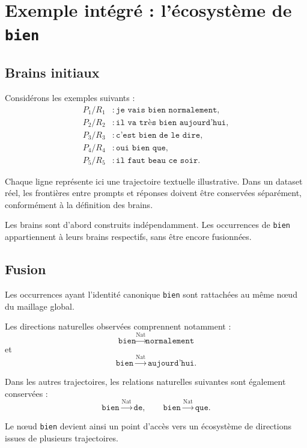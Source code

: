 \documentclass[11pt,a4paper]{report}
\theoremstyle{definition}
\theoremstyle{plain}
\theoremstyle{remark}
\begin{document}
\chapter{Exemple intégré : l'écosystème de \texttt{bien}}

\section{Brains initiaux}

Considérons les exemples suivants :
\[
\begin{aligned}
P_1/R_1 &: \texttt{je vais bien normalement},\\
P_2/R_2 &: \texttt{il va très bien aujourd'hui},\\
P_3/R_3 &: \texttt{c'est bien de le dire},\\
P_4/R_4 &: \texttt{oui bien que},\\
P_5/R_5 &: \texttt{il faut beau ce soir}.
\end{aligned}
\]

Chaque ligne représente ici une trajectoire textuelle illustrative.
Dans un dataset réel, les frontières entre prompts et réponses
doivent être conservées séparément, conformément à la définition
des brains.

Les brains sont d'abord construits indépendamment. Les occurrences
de \texttt{bien} appartiennent à leurs brains respectifs, sans
être encore fusionnées.

\section{Fusion}

Les occurrences ayant l'identité canonique \texttt{bien} sont
rattachées au même nœud du maillage global.

Les directions naturelles observées comprennent notamment :
\[
\texttt{bien}
\overset{\mathrm{Nat}}{\longrightarrow}
\texttt{normalement}
\]
et
\[
\texttt{bien}
\overset{\mathrm{Nat}}{\longrightarrow}
\texttt{aujourd'hui}.
\]

Dans les autres trajectoires, les relations naturelles suivantes
sont également conservées :
\[
\texttt{bien}
\overset{\mathrm{Nat}}{\longrightarrow}
\texttt{de},
\qquad
\texttt{bien}
\overset{\mathrm{Nat}}{\longrightarrow}
\texttt{que}.
\]

Le nœud \texttt{bien} devient ainsi un point d'accès vers un
écosystème de directions issues de plusieurs trajectoires.
\end{document}
